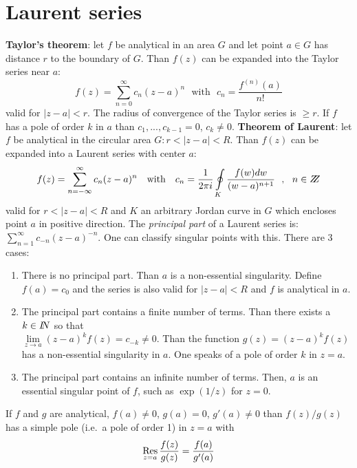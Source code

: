 \documentclass[a4paper,fancyheadings,twoside]{report}
\begin{document}
\section{Laurent series}
{\bf Taylor's theorem}: let $f$ be analytical in an area $G$ and let point
$a\in G$ has distance $r$ to the boundary of $G$. Than $f(z)$ can be expanded
into the Taylor series near $a$:
\[
f(z)=\sum_{n=0}^\infty c_n(z-a)^n~~~\mbox{with}~~~c_n=\frac{f^{(n)}(a)}{n!}
\]
valid for $|z-a|<r$. The radius of convergence of the Taylor series is $\geq r$.
If $f$ has a pole of order $k$ in $a$ than $c_1,...,c_{k-1}=0$, $c_k\neq0$.
\npar
{\bf Theorem of Laurent}: let $f$ be analytical in the circular area
$G:r<|z-a|<R$. Than $f(z)$ can be expanded into a Laurent series with center
$a$:
\[
f(z)=\sum_{n=-\infty}^\infty c_n(z-a)^n~~~\mbox{with}~~~
c_n=\frac{1}{2\pi i}\oint\limits_K\frac{f(w)dw}{(w-a)^{n+1}}~~,~~n\in Z\hspace{-1ex}Z
\]
valid for $r<|z-a|<R$ and $K$ an arbitrary Jordan curve in $G$ which encloses
point $a$ in positive direction.
\npar
The {\it principal part} of a Laurent series is: $\sum\limits_{n=1}^\infty c_{-n}(z-a)^{-n}$.
One can classify singular points with this. There are 3 cases:
\begin{enumerate}
\item There is no principal part. Than $a$ is a non-essential singularity.
      Define $f(a)=c_0$ and the series is also valid for $|z-a|<R$ and
      $f$ is analytical in $a$.
\item The principal part contains a finite number of terms. Than there exists
      a $k\in I\hspace{-1mm}N$ so that\\ $\lim\limits_{z\rightarrow a}(z-a)^kf(z)=c_{-k}\neq0$.
      Than the function $g(z)=(z-a)^kf(z)$ has a non-essential singularity in
      $a$. One speaks of a pole of order $k$ in $z=a$.
\item The principal part contains an infinite number of terms. Then, $a$ is an
      essential singular point of $f$, such as $\exp(1/z)$ for $z=0$.
\end{enumerate}
If $f$ and $g$ are analytical, $f(a)\neq0$, $g(a)=0$, $g'(a)\neq0$ than
$f(z)/g(z)$ has a simple pole (i.e.\ a pole of order 1) in $z=a$ with
\[
\mathop{\rm Res}\limits_{z=a}\frac{f(z)}{g(z)}=\frac{f(a)}{g'(a)}
\]
\end{document}
